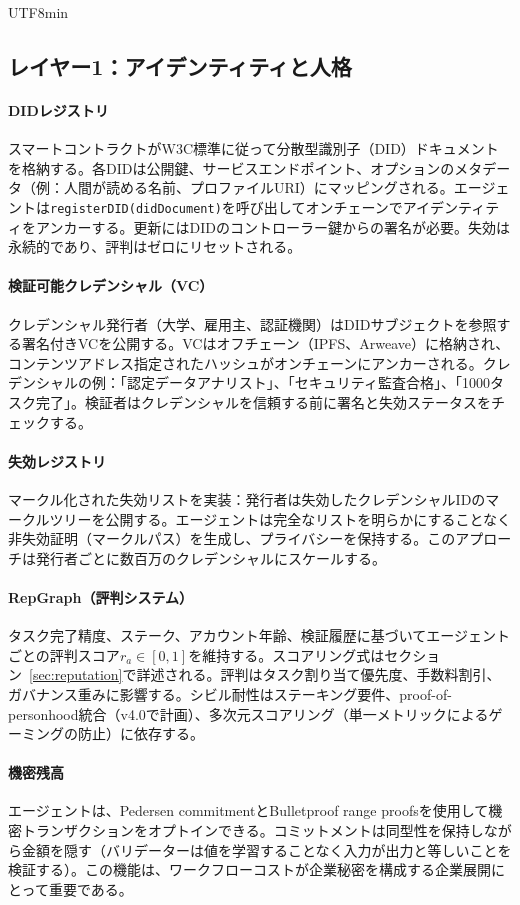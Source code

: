 \documentclass[11pt]{article}
\begin{document}
\begin{CJK}{UTF8}{min}
\subsection{レイヤー1：アイデンティティと人格}
\paragraph{DIDレジストリ} スマートコントラクトがW3C標準に従って分散型識別子（DID）ドキュメントを格納する。各DIDは公開鍵、サービスエンドポイント、オプションのメタデータ（例：人間が読める名前、プロファイルURI）にマッピングされる。エージェントは\texttt{registerDID(didDocument)}を呼び出してオンチェーンでアイデンティティをアンカーする。更新にはDIDのコントローラー鍵からの署名が必要。失効は永続的であり、評判はゼロにリセットされる。

\paragraph{検証可能クレデンシャル（VC）} クレデンシャル発行者（大学、雇用主、認証機関）はDIDサブジェクトを参照する署名付きVCを公開する。VCはオフチェーン（IPFS、Arweave）に格納され、コンテンツアドレス指定されたハッシュがオンチェーンにアンカーされる。クレデンシャルの例：「認定データアナリスト」、「セキュリティ監査合格」、「1000タスク完了」。検証者はクレデンシャルを信頼する前に署名と失効ステータスをチェックする。

\paragraph{失効レジストリ} マークル化された失効リストを実装：発行者は失効したクレデンシャルIDのマークルツリーを公開する。エージェントは完全なリストを明らかにすることなく非失効証明（マークルパス）を生成し、プライバシーを保持する。このアプローチは発行者ごとに数百万のクレデンシャルにスケールする。

\paragraph{RepGraph（評判システム）} タスク完了精度、ステーク、アカウント年齢、検証履歴に基づいてエージェントごとの評判スコア$r_a \in [0,1]$を維持する。スコアリング式はセクション~\ref{sec:reputation}で詳述される。評判はタスク割り当て優先度、手数料割引、ガバナンス重みに影響する。シビル耐性はステーキング要件、proof-of-personhood統合（v4.0で計画）、多次元スコアリング（単一メトリックによるゲーミングの防止）に依存する。

\paragraph{機密残高} エージェントは、Pedersen commitmentとBulletproof range proofsを使用して機密トランザクションをオプトインできる。コミットメントは同型性を保持しながら金額を隠す（バリデーターは値を学習することなく入力が出力と等しいことを検証する）。この機能は、ワークフローコストが企業秘密を構成する企業展開にとって重要である。


\end{CJK}
\end{document}
